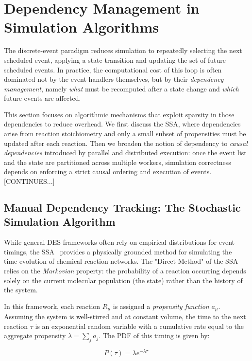 \section{Dependency Management in Simulation Algorithms}

The discrete-event paradigm reduces simulation to repeatedly selecting the next
scheduled event, applying a state transition and updating the set of future
scheduled events. In practice, the computational cost of this loop is often
dominated not by the event handlers themselves, but by their \emph{dependency
	management}, namely \emph{what} must be recomputed after a state change and
\emph{which} future events are affected.

This section focuses on algorithmic mechanisms that exploit sparsity in those
dependencies to reduce overhead. We first discuss the \ac{SSA}, where
dependencies arise from reaction stoichiometry and only a small subset of
propensities must be updated after each reaction. Then we broaden the notion of
dependency to \emph{causal dependencies} introduced by parallel and distributed
execution: once the event list and the state are partitioned across multiple
workers, simulation correctness depends on enforcing a strict causal ordering
and execution of events.  [CONTINUES...]

\subsection{Manual Dependency Tracking: The Stochastic Simulation Algorithm}\label{ssec:mdt}
While general \ac{DES} frameworks often rely on empirical distributions for
event timings, the \ac{SSA}~\cite{GillespieESSCCR:1977} provides a physically
grounded method for simulating the time-evolution of chemical reaction networks.
The "Direct Method" of the \ac{SSA} relies on the \emph{Markovian} property:
the probability of a reaction occurring depends solely on the current
molecular population (the state) rather than the history of the system.

In this framework, each reaction $R_\mu$ is assigned a \emph{propensity function}
$a_\mu$. Assuming the system is well-stirred and at constant volume, the
time to the next reaction $\tau$ is an exponential random variable with
a cumulative rate equal to the aggregate propensity $\lambda = \sum_j a_j$.
The \ac{PDF} of this timing is given by:

\begin{equation}\label{eq:nextreactiontime}
	P(\tau) = \lambda e^{-\lambda \tau}
\end{equation}

